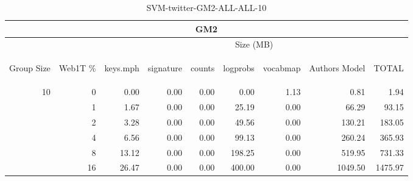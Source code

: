 \begin{center}
\begin{table}[htbp] 
 \begin{center}
\begin{tabular}{ | r | r | r | r | r | r | r | r | r |}
\hline
\multicolumn{9}{|c|}{GM2}\\
\hline
 & & \multicolumn{7}{|c|}{Size (MB)}\\ \cline{3-9}
\begin{sideways}Group Size\end{sideways} & \begin{sideways}Web1T \% \end{sideways} & \begin{sideways}keys.mph\end{sideways} & \begin{sideways}signature\end{sideways} & \begin{sideways}counts\end{sideways} & \begin{sideways}logprobs\end{sideways} & \begin{sideways}vocabmap\end{sideways} & \begin{sideways}Authors Model \end{sideways} & \begin{sideways}TOTAL\end{sideways}\\
\hline
\multirow{5}{*}{10}
 & 0 & 0.00 & 0.00 & 0.00 & 0.00 & 1.13 & 0.81 & 1.94\\ \cline{2-9}
 & 1 & 1.67 & 0.00 & 0.00 & 25.19 & 0.00 & 66.29 & 93.15\\ \cline{2-9}
 & 2 & 3.28 & 0.00 & 0.00 & 49.56 & 0.00 & 130.21 & 183.05\\ \cline{2-9}
 & 4 & 6.56 & 0.00 & 0.00 & 99.13 & 0.00 & 260.24 & 365.93\\ \cline{2-9}
 & 8 & 13.12 & 0.00 & 0.00 & 198.25 & 0.00 & 519.95 & 731.33\\ \cline{2-9}
 & 16 & 26.47 & 0.00 & 0.00 & 400.00 & 0.00 & 1049.50 & 1475.97\\ \cline{2-9}
\hline
\end{tabular}
\caption{SVM-twitter-GM2-ALL-ALL-10}
\label{table:SVM-twitter-GM2-ALL-ALL-10}
\end{center}
 \end{table}
\end{center}


